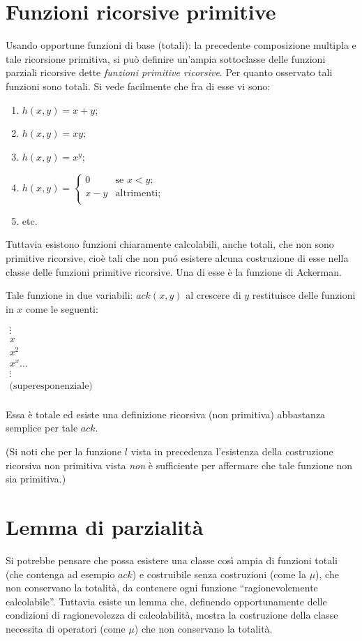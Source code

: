 \documentclass{book}
\begin{document}
\section{Funzioni ricorsive primitive}
Usando opportune funzioni di base (totali): la precedente composizione multipla
 e tale ricorsione primitiva, si pu\`o definire un'ampia sottoclasse delle 
funzioni parziali ricorsive dette \emph{funzioni primitive ricorsive}.
Per quanto osservato tali funzioni sono totali.
Si vede facilmente che fra di esse vi sono:
\begin{enumerate}
\item[] $h(x, y) = x + y$;
\item[] $h(x, y) = xy$;
\item[] $h(x, y) = x^y$;
\item[] $h(x, y) = \left\{ \begin{array}{ll}
                           0 & \text{se } x < y; \\
			   x - y & \text{altrimenti}; \\
			 \end{array} \right.$
\item[] etc.
\end{enumerate}
Tuttavia esistono funzioni chiaramente calcolabili, anche totali, che non sono
primitive ricorsive, cio\`e tali che non pu\'o esistere alcuna costruzione di 
esse nella classe delle funzioni primitive ricorsive. Una di esse \`e la 
funzione di Ackerman.

Tale funzione in due variabili: $ack(x, y)$ al crescere di $y$ restituisce
delle funzioni in $x$ come le seguenti:

$\begin{array}{l}
\vdots \\
x \\
x^2 \\
x^{x} \ldots \\
\vdots \\
\text{(superesponenziale)} \\
\end{array}$

Essa \`e totale ed esiste una definizione ricorsiva (non primitiva) abbastanza 
semplice per tale $ack$.

(Si noti che per la funzione $l$ vista in precedenza l'esistenza della
costruzione ricorsiva non primitiva vista \emph{non} \`e sufficiente per
affermare che tale funzione non sia primitiva.)

\section{Lemma di parzialit\`a}
Si potrebbe pensare che possa esistere una classe cos\`i ampia di funzioni 
totali (che contenga ad esempio $ack$) e costruibile senza costruzioni (come 
la $\mu$), che non conservano la totalit\`a, da contenere ogni funzione 
``ragionevolemente calcolabile''. Tuttavia esiste un lemma che, definendo 
opportunamente delle condizioni di ragionevolezza di calcolabilit\`a, mostra
la costruzione della classe necessita di operatori (come $\mu$) che non 
conservano la totalit\`a.
\end{document}
